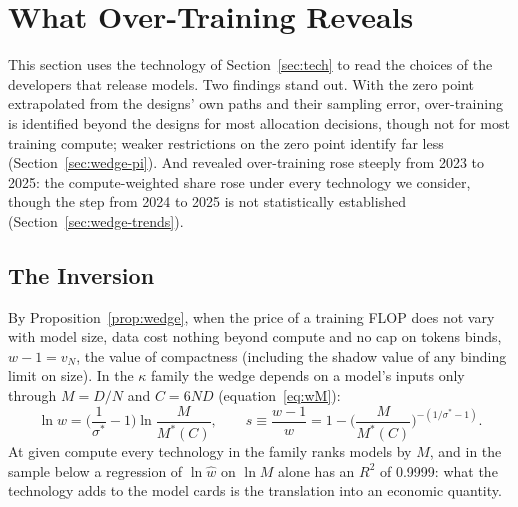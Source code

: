\section{What Over-Training Reveals}\label{sec:wedge}

This section uses the technology of Section~\ref{sec:tech} to read the choices of the developers that release models. Two
findings stand out. With the zero point extrapolated from the designs' own paths and their sampling error, over-training
is identified beyond the designs for most allocation decisions, though not for most training compute; weaker
restrictions on the zero point identify far less (Section~\ref{sec:wedge-pi}). And revealed over-training rose steeply
from 2023 to 2025: the compute-weighted share rose under every technology we consider, though the step from 2024 to
2025 is not statistically established (Section~\ref{sec:wedge-trends}).

\subsection{The Inversion}\label{sec:wedge-measure}

By Proposition~\ref{prop:wedge}, when the price of a training FLOP does not vary with model size, data cost nothing
beyond compute and no cap on tokens binds, $w-1=v_N$, the value of compactness (including the shadow value of any
binding limit on size). In the $\kappa$ family the wedge depends on a model's inputs only through $M=D/N$ and $C=6ND$
(equation~\eqref{eq:wM}):
\begin{equation}\label{eq:sIV-inv}
\ln w=\Big(\frac1{\sigma^*}-1\Big)\ln\frac{M}{M^*(C)},\qquad
s\equiv\frac{w-1}{w}=1-\Big(\frac{M}{M^*(C)}\Big)^{-(1/\sigma^*-1)}.
\end{equation}
At given compute every technology in the family ranks models by $M$, and in the sample below a regression of
$\ln\hat w$ on $\ln M$ alone has an $R^2$ of 0.9999: what the technology adds to the model cards is the translation into
an economic quantity.

